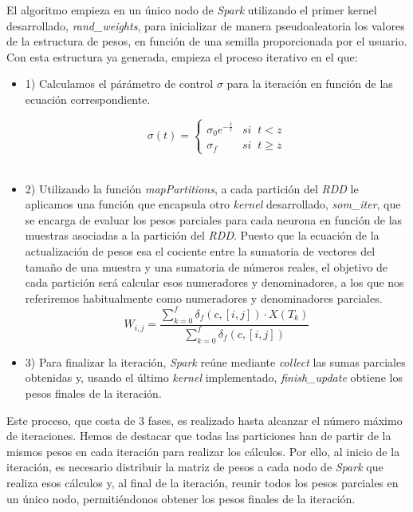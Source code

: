 El algoritmo empieza en un único nodo de \textit{Spark} utilizando el primer kernel desarrollado, \textit{rand\_weights}, para inicializar de manera pseudoaleatoria los valores de la estructura de pesos, en función de una semilla proporcionada por el usuario. Con esta estructura ya generada, empieza el proceso iterativo en el que:
\begin{itemize}
    \item 1) Calculamos el párámetro de control $\sigma$ para la iteración en función de las ecuación correspondiente.

$$\sigma(t) = \left\{
\begin{array}{ll}
\sigma_0e^{-\frac{t}{\tau}} & si \;\;t < z\\
\sigma_f & si  \;\; t\geq z
\end{array}
\right.
$$\\
    \item 2) Utilizando la función \textit{mapPartitions}, a cada partición del \textit{RDD} le aplicamos una función que encapsula otro \textit{kernel} desarrollado, \textit{som\_iter}, que se encarga de evaluar los pesos parciales para cada neurona en función de las muestras asociadas a la partición del \textit{RDD}. Puesto que la ecuación de la actualización de pesos esa el cociente entre la sumatoria de vectores del tamaño de una muestra y una sumatoria de números reales, el objetivo de cada partición será calcular esos numeradores y denominadores, a los que nos referiremos habitualmente como numeradores y denominadores parciales.
    $$
 W_{i, j} = \frac{\sum_{k=0}^{f} \delta_f(c, [i,j]) \cdot  X(T_k) }{\sum_{k=0}^{f} \delta_f(c, [i,j])}
$$
    \item 3) Para finalizar la iteración, \textit{Spark} reúne mediante \textit{collect} las sumas parciales obtenidas y, usando el último \textit{kernel} implementado, \textit{finish\_update} obtiene los pesos finales de la iteración.\\
\end{itemize}

Este proceso, que costa de 3 fases, es realizado hasta alcanzar el número máximo de iteraciones. Hemos de destacar que todas las particiones han de partir de la mismos pesos en cada iteración para realizar los cálculos. Por ello, al inicio de la iteración, es necesario distribuir la matriz de pesos a cada nodo de \textit{Spark} que realiza esos cálculos y, al final de la iteración, reunir todos los pesos parciales en un único nodo, permitiéndonos obtener los pesos finales de la iteración. \\

